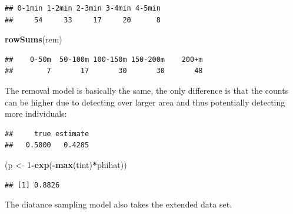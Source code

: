 \documentclass[12pt,]{book}
\newenvironment{Shaded}{\begin{snugshade}}{\end{snugshade}}
\newcommand{\DataTypeTok}[1]{\textcolor[rgb]{0.13,0.29,0.53}{#1}}
\newcommand{\DecValTok}[1]{\textcolor[rgb]{0.00,0.00,0.81}{#1}}
\newcommand{\KeywordTok}[1]{\textcolor[rgb]{0.13,0.29,0.53}{\textbf{#1}}}
\newcommand{\NormalTok}[1]{#1}
\newcommand{\OperatorTok}[1]{\textcolor[rgb]{0.81,0.36,0.00}{\textbf{#1}}}
\newcommand{\StringTok}[1]{\textcolor[rgb]{0.31,0.60,0.02}{#1}}
\begin{document}
\begin{verbatim}
## 0-1min 1-2min 2-3min 3-4min 4-5min 
##     54     33     17     20      8
\end{verbatim}

\begin{Shaded}
\begin{Highlighting}[]
\KeywordTok{rowSums}\NormalTok{(rem)}
\end{Highlighting}
\end{Shaded}

\begin{verbatim}
##    0-50m  50-100m 100-150m 150-200m    200+m 
##        7       17       30       30       48
\end{verbatim}

The removal model is basically the same, the only
difference is that the counts can be higher due to
detecting over larger area and thus potentially
detecting more individuals:

\begin{Shaded}
\end{Shaded}

\begin{verbatim}
##     true estimate 
##   0.5000   0.4285
\end{verbatim}

\begin{Shaded}
\begin{Highlighting}[]
\NormalTok{(p <-}\StringTok{ }\DecValTok{1}\OperatorTok{-}\KeywordTok{exp}\NormalTok{(}\OperatorTok{-}\KeywordTok{max}\NormalTok{(tint)}\OperatorTok{*}\NormalTok{phihat))}
\end{Highlighting}
\end{Shaded}

\begin{verbatim}
## [1] 0.8826
\end{verbatim}

The diatance sampling model also takes the extended data set.
\end{document}

